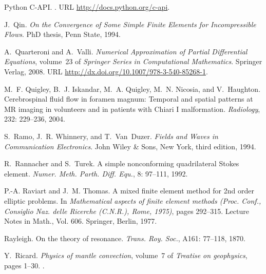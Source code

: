 \begin{thebibliography}{467}
Python C-API.
.
\newblock URL \url{http://docs.python.org/c-api}.

J.~Qin.
\newblock \emph{On the Convergence of Some Simple Finite Elements for
  Incompressible Flows}.
\newblock PhD thesis, Penn State, 1994.

A.~Quarteroni and A.~Valli.
\newblock \emph{Numerical Approximation of Partial Differential Equations},
  volume~23 of \emph{Springer Series in Computational Mathematics}.
\newblock Springer Verlag, 2008.
\newblock URL \url{http://dx.doi.org/10.1007/978-3-540-85268-1}.

M.~F. Quigley, B.~J. Iskandar, M.~A. Quigley, M.~N. Nicosia, and V.~Haughton.
\newblock Cerebrospinal fluid flow in foramen magnum: {T}emporal and spatial
  patterns at {MR} imaging in volunteers and in patients with {C}hiari {I}
  malformation.
\newblock \emph{Radiology}, 232: 229--236, 2004.

S.~Ramo, J.~R. Whinnery, and T.~Van~Duzer.
\newblock \emph{Fields and Waves in Communication Electronics}.
\newblock John Wiley \& Sons, New York, third edition, 1994.

R.~Rannacher and S.~Turek.
\newblock A simple nonconforming quadrilateral {S}tokes element.
\newblock \emph{Numer. Meth. Parth. Diff. Equ.}, 8: 97--111, 1992.

P.-A. Raviart and J.~M. Thomas.
\newblock A mixed finite element method for 2nd order elliptic problems.
\newblock In \emph{Mathematical aspects of finite element methods ({P}roc.
  {C}onf., {C}onsiglio {N}az. delle {R}icerche ({C}.{N}.{R}.), {R}ome, 1975)},
  pages 292--315. Lecture Notes in Math., Vol. 606. Springer, Berlin, 1977.

Rayleigh.
\newblock On the theory of resonance.
\newblock \emph{Trans. Roy. Soc.}, A161: 77--118, 1870.

Y.~Ricard.
\newblock \emph{Physics of mantle convection}, volume~7 of \emph{Treatise on
  geophysics}, pages 1--30.
.


\end{thebibliography}
